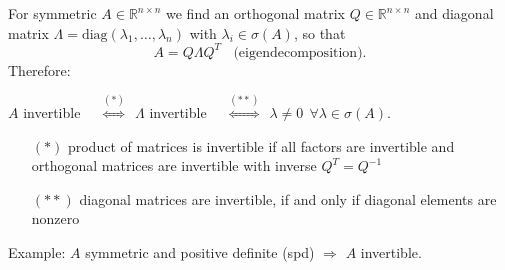{\begin{enumerate}
	For symmetric $A\in\mathbb{R}^{n\times n}$ we find an orthogonal matrix $Q\in\mathbb{R}^{n\times n}$ and diagonal matrix $\Lambda = \text{diag}(\lambda_1,\ldots,\lambda_n)$ with $\lambda_i\in\sigma(A)$, so that   $$A=Q\Lambda Q^T ~~~~\text{(eigendecomposition)}.$$
	Therefore:
	\begin{center}
		$A$ invertible 
		~~$\stackrel{(*)}{\Leftrightarrow}\ \ \Lambda$ invertible 
		~~$\stackrel{(**)}{\Leftrightarrow}\ \ \lambda\neq 0\ \ \forall\lambda\in\sigma(A)$.
	\end{center}
	\begin{itemize}
		\item[$(*)$]  product of matrices is invertible if all factors are invertible and orthogonal matrices are invertible with inverse $Q^T=Q^{-1}$
		\item[$(**)$] diagonal matrices are invertible, if and only if diagonal elements are nonzero
	\end{itemize}
Example: $A$ symmetric and positive definite (spd) $\Rightarrow$ $A$ invertible.
\end{enumerate}
}